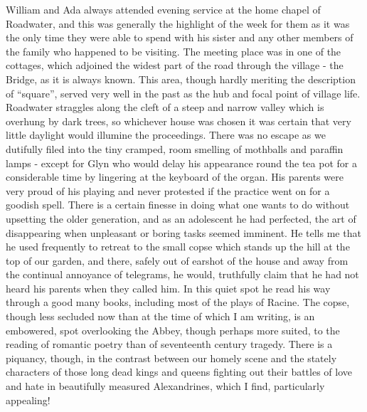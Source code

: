 William and Ada always attended evening service at the home chapel of Roadwater, and this was generally the highlight of the week for them as it was the only time they were able to spend with his sister and any other members of the family who happened to be visiting. The meeting place was in one of the cottages, which adjoined the widest part of the road through the village - the Bridge, as it is always known. This area, though hardly meriting the description of “square”, served very well in the past as the hub and focal point of village life. Roadwater straggles along the cleft of a steep and narrow valley which is overhung by dark trees, so whichever house was chosen it was certain that very little daylight would illumine the proceedings. There was no escape as we dutifully filed into the tiny cramped, room smelling of mothballs and paraffin lamps - except for Glyn who would delay his appearance round the tea pot for a considerable time by lingering at the keyboard of the organ. His parents were very proud of his playing and never protested if the practice went on for a goodish spell. There is a certain finesse in doing what one wants to do without upsetting the older generation, and as an adolescent he had perfected, the art of disappearing when unpleasant or boring tasks seemed imminent. He tells me that he used frequently to retreat to the small copse which stands up the hill at the top of our garden, and there, safely out of earshot of the house and away from the continual annoyance of telegrams, he would, truthfully claim that he had not heard his parents when they called him. In this quiet spot he read his way through a good many books, including most of the plays of Racine. The copse, though less secluded now than at the time of which I am writing, is an embowered, spot overlooking the Abbey, though perhaps more suited, to the reading of romantic poetry than of seventeenth century tragedy. There is a piquancy, though, in the contrast between our homely scene and the stately characters of those long dead kings and queens fighting out their battles of love and hate in beautifully measured Alexandrines, which I find, particularly appealing!

